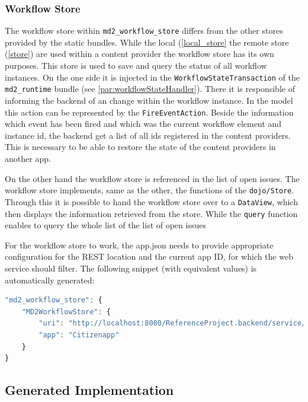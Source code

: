 \subsubsection{Workflow Store} \label{workflow_store}

The workflow store within \lstinline|md2_workflow_store| differs from the other stores provided by the static bundles. While the local (\cref{local_store} the remote store (\cref{store}) are used within a content provider the workflow store has its own purposes. This store is used to save and query the status of all workflow instances. On the one side it is injected in the \lstinline|WorkflowStateTransaction| of the \lstinline|md2_runtime| bundle (see \cref{par:workflowStateHandler}). There it is responsible of informing the backend of an change within the workflow instance. In the model this action can be represented by the \lstinline|FireEventAction|. Beside the information which event has been fired and which was the current workflow element and instance id, the backend get a list of all ids registered in the content providers. This is necessary to be able to restore the state of the content providers in another app.

On the other hand the workflow store is referenced in the list of open issues. The workflow store implements, same as the other, the functions of the \lstinline|dojo/Store|. Through this it is possible to hand the workflow store over to a \lstinline|DataView|, which then displays the information retrieved from the store. While the \lstinline|query| function enables to query the whole list of the list of open issues

For the workflow store to work, the app.json needs to provide appropriate configuration for the REST location and the current app ID, for which the web service should filter. The following snippet (with equivalent values) is automatically generated:
\begin{lstlisting}[language=Javascript]
"md2_workflow_store": {
	"MD2WorkflowStore": {
		"uri": "http://localhost:8080/ReferenceProject.backend/service/workflowState/",
		"app": "Citizenapp"
	}
}
\end{lstlisting}


\subsection{Generated \mapapps Implementation} 

